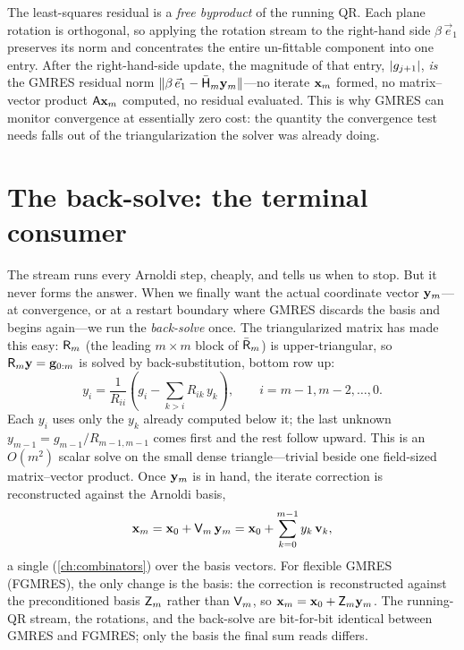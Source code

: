 \begin{keyidea}
The least-squares residual is a \emph{free byproduct} of the running QR. Each plane
rotation is orthogonal, so applying the rotation stream to the right-hand side $\beta\,
\vec e_1$ preserves its norm and concentrates the entire un-fittable component into one
entry. After the right-hand-side update, the magnitude of that entry, $\lvert g_{j+1}\rvert$,
\emph{is} the GMRES residual norm $\lVert\beta\,\vec e_1 - \bar{\mathsf{H}}_m\mathbf{y}_m\rVert$---no
iterate $\mathbf{x}_m$ formed, no matrix--vector product $\mathsf{A}\mathbf{x}_m$ computed, no residual
evaluated. This is why GMRES can monitor convergence at essentially zero cost: the
quantity the convergence test needs falls out of the triangularization the solver was
already doing.
\end{keyidea}

\section{The back-solve: the terminal consumer}
\label{sec:gv-backsolve}

The stream runs every Arnoldi step, cheaply, and tells us when to stop. But it never
forms the answer. When we finally want the actual coordinate vector $\mathbf{y}_m$---at
convergence, or at a restart boundary where GMRES discards the basis and begins
again---we run the \emph{back-solve} once. The triangularized matrix has made this easy:
$\mathsf{R}_m$ (the leading $m\times m$ block of $\bar{\mathsf{R}}_m$) is upper-triangular, so
$\mathsf{R}_m\mathbf{y} = \mathbf{g}_{0:m}$ is solved by back-substitution, bottom row up:
\begin{equation}
\label{eq:gv-backsub}
  y_i = \frac{1}{R_{ii}}\!\left(g_i - \sum_{k>i} R_{ik}\,y_k\right),
  \qquad i = m{-}1, m{-}2, \dots, 0.
\end{equation}
Each $y_i$ uses only the $y_k$ already computed below it; the last unknown $y_{m-1} =
g_{m-1}/R_{m-1,m-1}$ comes first and the rest follow upward. This is an $O(m^2)$ scalar
solve on the small dense triangle---trivial beside one field-sized matrix--vector
product. Once $\mathbf{y}_m$ is in hand, the iterate correction is reconstructed against the
Arnoldi basis,
\begin{equation}
\label{eq:gv-reconstruct}
  \mathbf{x}_m = \mathbf{x}_0 + \mathsf{V}_m\,\mathbf{y}_m = \mathbf{x}_0 + \sum_{k=0}^{m-1} y_k\,\mathbf{v}_k,
\end{equation}
a single  (\cref{ch:combinators}) over the basis vectors. For
flexible GMRES (FGMRES), the only change is the basis: the correction is reconstructed
against the preconditioned basis $\mathsf{Z}_m$ rather than $\mathsf{V}_m$, so
$\mathbf{x}_m = \mathbf{x}_0 + \mathsf{Z}_m\mathbf{y}_m$. The running-QR stream, the rotations, and the
back-solve are bit-for-bit identical between GMRES and FGMRES; only the basis the final
sum reads differs.

